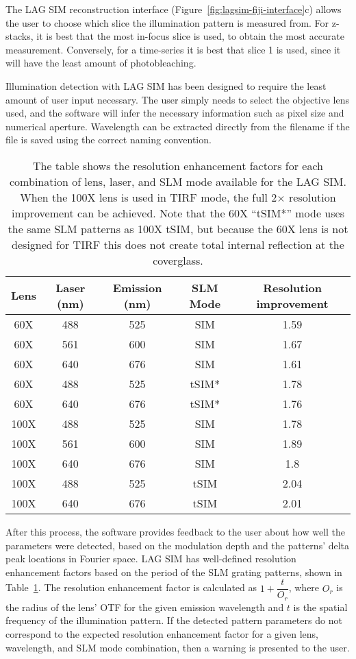The LAG SIM reconstruction interface (Figure~\ref{fig:lagsim-fiji-interface}c) allows the user to choose which slice the illumination pattern is measured from.
For z-stacks, it is best that the most in-focus slice is used, to obtain the most accurate measurement.
Conversely, for a time-series it is best that slice 1 is used, since it will have the least amount of photobleaching.

Illumination detection with LAG SIM has been designed to require the least amount of user input necessary.
The user simply needs to select the objective lens used, and the software will infer the necessary information such as pixel size and numerical aperture.
Wavelength can be extracted directly from the filename if the file is saved using the correct naming convention.

\begin{table}[h!]
\caption[LAG SIM: Different combinations of lenses, wavelengths, and SLM grating patterns provide different resolution enhancement factors]{\label{tab:resolution}The table shows the resolution enhancement factors for each combination of lens, laser, and SLM mode available for the LAG SIM. When the 100X lens is used in TIRF mode, the full 2$\times$ resolution improvement can be achieved. Note that the 60X ``tSIM*'' mode uses the same SLM patterns as 100X tSIM, but because the 60X lens is not designed for TIRF this does not create total internal reflection at the coverglass. }
\centering
\begin{tabular}{|c|c|c|c|c|}
\hline
Lens &	Laser (nm) &	Emission (nm) & SLM Mode & Resolution improvement \\ \hline
60X &	488 &	525 &	SIM &	1.59 \\
60X &	561 &	600 &	SIM &	1.67 \\
60X &	640 &	676 &	SIM &	1.61 \\
60X &	488 &	525 &	tSIM* &	1.78 \\
60X &	640 &	676 &	tSIM* &	1.76 \\
100X &	488 &	525 &	SIM &	1.78 \\
100X &	561 &	600 &	SIM &	1.89 \\
100X &	640 &	676 &	SIM &	1.8 \\
100X &	488 &	525 &	tSIM &	2.04 \\
100X &	640 &	676 &	tSIM &	2.01 \\ \hline
\end{tabular}
\end{table}

After this process, the software provides feedback to the user about how well the parameters were detected, based on the modulation depth and the patterns' delta peak locations in Fourier space.
LAG SIM has well-defined resolution enhancement factors based on the period of the SLM grating patterns, shown in Table~\ref{tab:resolution}.
The resolution enhancement factor is calculated as $1 + \dfrac{t}{O_r}$, where $O_r$ is the radius of the lens' OTF for the given emission wavelength and $t$ is the spatial frequency of the illumination pattern.
If the detected pattern parameters do not correspond to the expected resolution enhancement factor for a given lens, wavelength, and SLM mode combination, then a warning is presented to the user.

